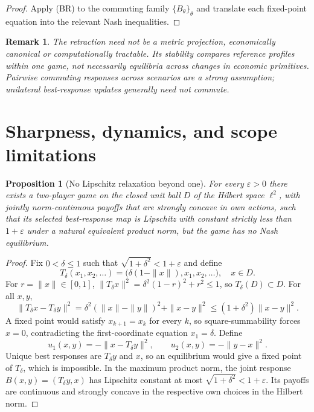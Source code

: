 \documentclass[11pt]{article}
\newtheorem{proposition}[theorem]{Proposition}
\newtheorem{remark}[theorem]{Remark}
\theoremstyle{definition}\newtheorem{definition}[theorem]{Definition}
\begin{document}
\begin{proof}
Apply (BR) to the commuting family $\{B_\theta\}_\theta$ and translate each fixed-point equation into the relevant Nash inequalities.
\end{proof}
\begin{remark}
The retraction need not be a metric projection, economically canonical or computationally tractable. Its stability compares \emph{reference profiles within one game}, not necessarily equilibria across changes in economic primitives. Pairwise commuting responses across scenarios are a strong assumption; unilateral best-response updates generally need not commute.
\end{remark}

\section{Sharpness, dynamics, and scope limitations}
\begin{proposition}[No Lipschitz relaxation beyond one\label{prop:sharp}]
For every $\varepsilon>0$ there exists a two-player game on the closed unit ball $D$ of the Hilbert space $\ell^2$, with jointly norm-continuous payoffs that are strongly concave in own actions, such that its selected best-response map is Lipschitz with constant strictly less than $1+\varepsilon$ under a natural equivalent product norm, but the game has no Nash equilibrium.
\end{proposition}
\begin{proof}
Fix $0<\delta\le1$ such that $\sqrt{1+\delta^2}<1+\varepsilon$ and define
\[T_\delta(x_1,x_2,\ldots)=\bigl(\delta(1-\|x\|),x_1,x_2,\ldots\bigr),\quad x\in D.\]
For $r=\|x\|\in[0,1]$, $\|T_\delta x\|^2=\delta^2(1-r)^2+r^2\le1$, so $T_\delta(D)\subset D$. For all $x,y$,
\[\|T_\delta x-T_\delta y\|^2=\delta^2(\|x\|-\|y\|)^2+\|x-y\|^2
\le(1+\delta^2)\|x-y\|^2.\]
A fixed point would satisfy $x_{k+1}=x_k$ for every $k$, so square-summability forces $x=0$, contradicting the first-coordinate equation $x_1=\delta$. Define
\[u_1(x,y)=-\|x-T_\delta y\|^2,\qquad u_2(x,y)=-\|y-x\|^2.\]
Unique best responses are $T_\delta y$ and $x$, so an equilibrium would give a fixed point of $T_\delta$, which is impossible. In the maximum product norm, the joint response $B(x,y)=(T_\delta y,x)$ has Lipschitz constant at most $\sqrt{1+\delta^2}<1+\varepsilon$. Its payoffs are continuous and strongly concave in the respective own choices in the Hilbert norm.
\end{proof}
\end{document}
